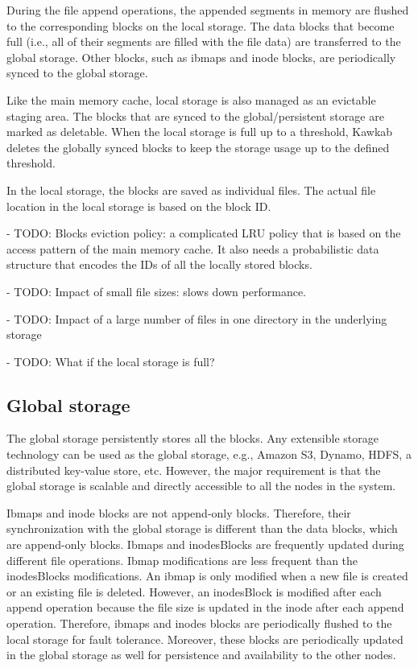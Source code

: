 \documentclass[]{article}
\begin{document}
During the file append operations, the appended segments in memory are flushed
to the corresponding blocks on the local storage.  The data blocks that become
full (i.e., all of their segments are filled with the file data)
are transferred to the global storage.  Other blocks, such as ibmaps and
inode blocks, are periodically synced to the global storage.

Like the main memory cache, local storage is also managed as an evictable
staging area. The blocks that are synced to the global/persistent storage are
marked as deletable. When the local storage is full up to a threshold, Kawkab
deletes the globally synced blocks to keep the storage usage up to
the defined threshold.

In the local storage, the blocks are saved as individual files. The actual
file location in the local storage is based on the block ID.

- TODO: Blocks eviction policy: a complicated LRU policy that is based on the
  access pattern of the main memory cache. It also needs a probabilistic
  data structure that encodes the IDs of all the locally stored blocks.

- TODO: Impact of small file sizes: slows down performance.

- TODO: Impact of a large number of files in one directory in the underlying storage

- TODO: What if the local storage is full?


\subsection{Global storage}

The global storage persistently stores all the blocks. Any extensible storage
technology can be used as the global storage, e.g., Amazon S3, Dynamo, HDFS, a
distributed key-value store, etc. However, the major requirement is that the 
global storage is scalable and directly accessible to all the nodes in the system.

Ibmaps and inode blocks are not append-only blocks. Therefore, their
synchronization with the global storage is different than the data blocks,
which are append-only blocks. Ibmaps and inodesBlocks are frequently updated
during different file operations. Ibmap modifications are less frequent than
the inodesBlocks modifications. An ibmap is only modified when a new file is
created or an existing file is deleted.  However, an inodesBlock is modified
after each append operation because the file size is updated in
the inode after each append operation. Therefore, ibmaps and inodes blocks are
periodically flushed to the local storage for fault tolerance.  Moreover, these
blocks are periodically updated in the global storage as well for persistence
and availability to the other nodes.
\end{document}
